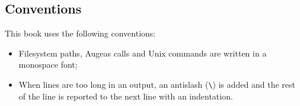 \subsection{Conventions}

This book uses the following conventions:
\begin{itemize}
  \item
    Filesystem paths, Augeas calls and Unix commands are written in a monospace font;
  \item
    When lines are too long in an output, an antislash (\verb!\!) is added and the rest of the line is reported to the next line with an indentation.
\end{itemize}



